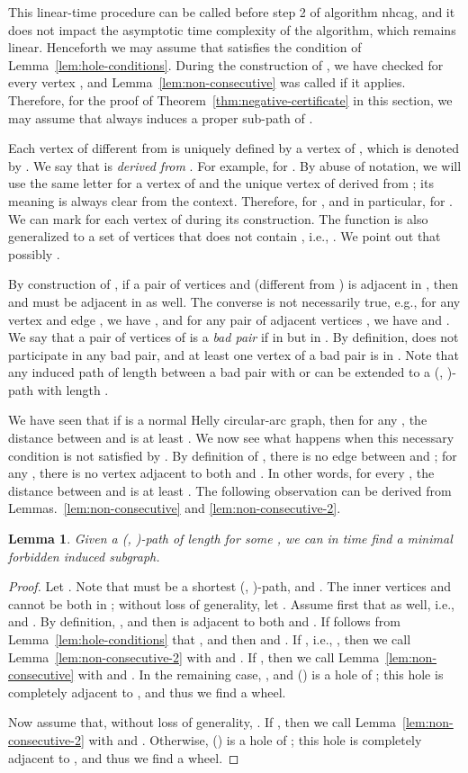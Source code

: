 \documentclass[10pt]{article}
\newtheorem{lemma}[theorem]{Lemma}
\newcommand{\badgraph}{minimal forbidden induced subgraph}
\newcommand{\nhcag}{normal Helly circular-arc graph}
\newcommand{\stpath}[2]{(, )-path}
\begin{document}
This linear-time procedure can be called before step 2 of algorithm
{nhcag}, and it does not impact the asymptotic time complexity of
the algorithm, which remains linear.  Henceforth we may assume that
 satisfies the condition of Lemma~\ref{lem:hole-conditions}.  During
the construction of , we have checked  for every
vertex , and Lemma~\ref{lem:non-consecutive} was called if it
applies.  Therefore, for the proof of
Theorem~\ref{thm:negative-certificate} in this section, we may assume
that  always induces a proper sub-path of .

Each vertex  of  different from  is uniquely defined by
a vertex of , which is denoted by .  We say that  is
\emph{derived from} .   For example, 
for .  By abuse of notation, we will use the same letter for
a vertex  of  and the unique vertex of
 derived from ; its meaning is always clear from the
context.  Therefore,  for , and in
particular,  for .  We can mark
 for each vertex of  during its construction.  The
function  is also generalized to a set  of vertices that does
not contain , i.e., .  We point out
that possibly .

By construction of , if a pair of vertices  and 
(different from ) is adjacent in , then  and
 must be adjacent in  as well.  The converse is not
necessarily true, e.g., for any vertex  and edge , we have , and for any pair of adjacent vertices
, we have  and .  We say
that a pair of vertices  of  is a \emph{bad pair} if
 in  but  in .  By
definition,  does not participate in any bad pair, and at least one
vertex of a bad pair is in .  Note that any induced path of
length  between a bad pair  with  or  can be
extended to a \stpath{v^l}{v^r} with length .

We have seen that if  is a \nhcag, then for any , the
distance between  and  is at least .  We now see what
happens when this necessary condition is not satisfied by .
By definition of , there is no edge between  and ; for
any , there is no vertex adjacent to both  and .
In other words, for every , the distance between  and
 is at least .  The following observation can be derived from
Lemmas.~\ref{lem:non-consecutive} and \ref{lem:non-consecutive-2}.
\begin{lemma}\label{lem:3-cover}
  Given a \stpath{v^l}{v^r}  of length  for some , we
  can in  time find a \badgraph.
\end{lemma}
\begin{proof}
  Let .  Note that  must be a shortest
  \stpath{v^l}{v^r}, and .  The inner vertices  and 
  cannot be both in ; without loss of generality, let .  Assume first that  as well,
  i.e.,  and .  By definition, , and then  is adjacent to both  and .
  If follows from Lemma~\ref{lem:hole-conditions} that , and then  and .  If
  , i.e., , then we call
  Lemma~\ref{lem:non-consecutive-2} with  and .  If , then we call Lemma~\ref{lem:non-consecutive} with  and
  .  In the remaining case, , and
  () is a hole of ; this hole is
  completely adjacent to , and thus we find a wheel.

  Now assume that, without loss of generality, .  If
  , then we call
  Lemma~\ref{lem:non-consecutive-2} with  and .  Otherwise, () is a hole of ; this hole
  is completely adjacent to , and thus we find a wheel.
\end{proof}
\end{document}
